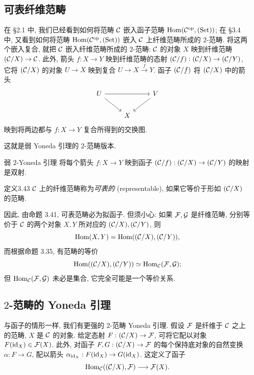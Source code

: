 \subsection{可表纤维范畴}
在 \S2.1 中, 我们已经看到如何将范畴 $\mathcal C$ 嵌入函子范畴 $\operatorname{Hom}(\mathcal C^{\mathrm{op}},(\mathrm{Set}))$; 在 \S3.4 中, 又看到如何将范畴 $\operatorname{Hom}(\mathcal C^{\mathrm{op}},(\mathrm{Set}))$ 嵌入 $\mathcal C$ 上纤维范畴所成的 $2$-范畴. 将这两个嵌入复合, 就把 $\mathcal C$ 嵌入纤维范畴所成的 $2$-范畴: $\mathcal C$ 的对象 $X$ 映到纤维范畴 $(\mathcal C/X)\to\mathcal C$. 此外, 箭头 $f:X\to Y$ 映到纤维范畴的态射 $(\mathcal C/f):(\mathcal C/X)\to(\mathcal C/Y)$, 它将 $(\mathcal C/X)$ 的对象 $U\to X$ 映到复合 $U\to X\xrightarrow f Y$. 函子 $(\mathcal C/f)$ 将 $(\mathcal C/X)$ 中的箭头
\[
\begin{tikzcd}
U\arrow[rr]\arrow[dr]&&V\arrow[dl]\\
&X&
\end{tikzcd}
\]
映到将两边都与 $f:X\to Y$ 复合所得到的交换图.

这就是弱 Yoneda 引理的 $2$-范畴版本.

\begin{origstatement}{弱 $2$-Yoneda 引理}{}\label{ch03:weak2yoneda}
将每个箭头 $f:X\to Y$ 映到函子 $(\mathcal C/f):(\mathcal C/X)\to(\mathcal C/Y)$ 的映射是双射.
\end{origstatement}

\begin{origstatement}{定义}{3.43}\label{ch03:def343}
$\mathcal C$ 上的纤维范畴称为\emph{可表的} (representable), 如果它等价于形如 $(\mathcal C/X)$ 的范畴.
\end{origstatement}

因此, 由命题 3.41, 可表范畴必为拟函子. 但须小心: 如果 $\mathcal F,\mathcal G$ 是纤维范畴, 分别等价于 $\mathcal C$ 的两个对象 $X,Y$ 所对应的 $(\mathcal C/X),(\mathcal C/Y)$, 则
\[
\operatorname{Hom}(X,Y)=\operatorname{Hom}((\mathcal C/X),(\mathcal C/Y)),
\]
而根据命题 3.35, 有范畴的等价
\[
\operatorname{Hom}((\mathcal C/X),(\mathcal C/Y))\simeq\operatorname{Hom}_{\mathcal C}(\mathcal F,\mathcal G);
\]
但 $\operatorname{Hom}_{\mathcal C}(\mathcal F,\mathcal G)$ 未必是集合, 它完全可能是一个等价关系.

\subsection{$2$-范畴的 Yoneda 引理}
与函子的情形一样, 我们有更强的 $2$-范畴 Yoneda 引理. 假设 $\mathcal F$ 是纤维于 $\mathcal C$ 之上的范畴, $X$ 是 $\mathcal C$ 的对象. 给定态射 $F:(\mathcal C/X)\to\mathcal F$, 可将它配以对象 $F(\mathrm{id}_X)\in\mathcal F(X)$. 此外, 对函子 $F,G:(\mathcal C/X)\to\mathcal F$ 的每个保持底对象的自然变换 $\alpha:F\to G$, 配以箭头 $\alpha_{\mathrm{id}_X}:F(\mathrm{id}_X)\to G(\mathrm{id}_X)$. 这定义了函子
\[
\operatorname{Hom}_{\mathcal C}((\mathcal C/X),\mathcal F)\longrightarrow\mathcal F(X).
\]

